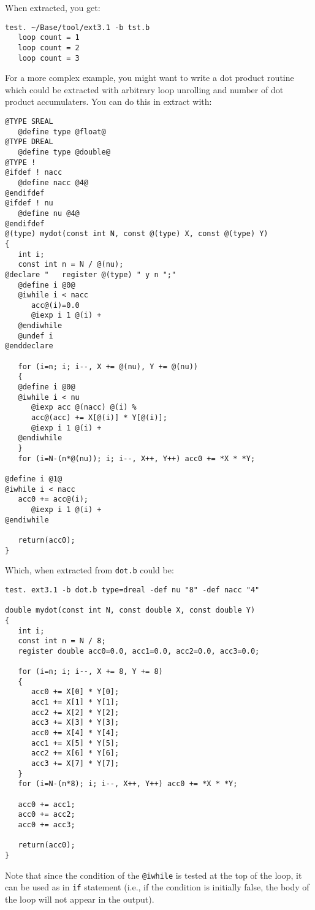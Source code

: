 \noindent
When extracted, you get:
\begin{verbatim}
test. ~/Base/tool/ext3.1 -b tst.b
   loop count = 1
   loop count = 2
   loop count = 3
\end{verbatim}

For a more complex example, you might want to write a dot product routine
which could be extracted with arbitrary loop unrolling and number of dot
product accumulaters.  You can do this in extract with:
\begin{verbatim}
@TYPE SREAL
   @define type @float@
@TYPE DREAL
   @define type @double@
@TYPE !
@ifdef ! nacc
   @define nacc @4@
@endifdef
@ifdef ! nu
   @define nu @4@
@endifdef
@(type) mydot(const int N, const @(type) X, const @(type) Y)
{
   int i;
   const int n = N / @(nu);
@declare "   register @(type) " y n ";"
   @define i @0@
   @iwhile i < nacc
      acc@(i)=0.0
      @iexp i 1 @(i) +
   @endiwhile
   @undef i
@enddeclare

   for (i=n; i; i--, X += @(nu), Y += @(nu))
   {
   @define i @0@
   @iwhile i < nu
      @iexp acc @(nacc) @(i) %
      acc@(acc) += X[@(i)] * Y[@(i)];
      @iexp i 1 @(i) +
   @endiwhile
   }
   for (i=N-(n*@(nu)); i; i--, X++, Y++) acc0 += *X * *Y;

@define i @1@
@iwhile i < nacc
   acc0 += acc@(i);
      @iexp i 1 @(i) +
@endiwhile

   return(acc0);
}
\end{verbatim}

Which, when extracted from {\tt dot.b} could be:
\begin{verbatim}
test. ext3.1 -b dot.b type=dreal -def nu "8" -def nacc "4"

double mydot(const int N, const double X, const double Y)
{
   int i;
   const int n = N / 8;
   register double acc0=0.0, acc1=0.0, acc2=0.0, acc3=0.0;

   for (i=n; i; i--, X += 8, Y += 8)
   {
      acc0 += X[0] * Y[0];
      acc1 += X[1] * Y[1];
      acc2 += X[2] * Y[2];
      acc3 += X[3] * Y[3];
      acc0 += X[4] * Y[4];
      acc1 += X[5] * Y[5];
      acc2 += X[6] * Y[6];
      acc3 += X[7] * Y[7];
   }
   for (i=N-(n*8); i; i--, X++, Y++) acc0 += *X * *Y;

   acc0 += acc1;
   acc0 += acc2;
   acc0 += acc3;

   return(acc0);
}
\end{verbatim}

Note that since the condition of the {\tt @iwhile} is tested at the top of
the loop, it can be used as in {\tt if} statement (i.e., if the condition
is initially false, the body of the loop will not appear in the output).

